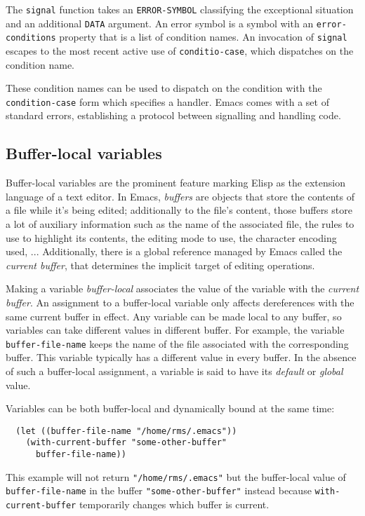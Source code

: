 \documentclass[format=acmsmall, review=false, screen=true]{acmart}
\newcommand \Elisp {Elisp}
\begin{document}
The \texttt{signal} function takes an \texttt{ERROR-SYMBOL}
classifying the exceptional situation and an additional \texttt{DATA}
argument.  An error symbol is a symbol with an
\texttt{error-conditions} property that is a list of condition names.
An invocation of \texttt{signal} escapes to the most recent active use
of \texttt{conditio-case}, which dispatches on the condition name.

These condition names can be used to dispatch on the condition with
the \texttt{condition-case} form which specifies a handler.  Emacs
comes with a set of standard errors, establishing a protocol between
signalling and handling code.

\subsection{Buffer-local variables}
\label{sec:buffer-local-variables}

Buffer-local variables are the prominent feature marking \Elisp{} as the
extension language of a text editor.  In Emacs, \emph{buffers} are objects
that store the contents of a file while it's being edited; additionally to
the file's content, those buffers store a lot of auxiliary information such
as the name of the associated file, the rules to use to highlight its
contents, the editing mode to use, the character encoding used, ...
Additionally, there is a global reference managed by Emacs called the
\emph{current buffer}, that determines the implicit target of
editing operations.

Making a variable \emph{buffer-local} associates the value of the variable
with the \emph{current buffer}.  An assignment to a buffer-local variable
only affects dereferences with the same current buffer in effect.
Any variable can be made local to any buffer, so variables can take
different values in different buffer.  For example, the variable
\texttt{buffer-file-name} keeps the name of the file associated with the
corresponding buffer.  This variable typically has a different value in
every buffer.  In the absence of such a buffer-local assignment, a variable
is said to have its \emph{default} or \emph{global} value.

Variables can be both buffer-local and dynamically bound at the same time:
\begin{verbatim}
  (let ((buffer-file-name "/home/rms/.emacs"))
    (with-current-buffer "some-other-buffer"
      buffer-file-name))
\end{verbatim}
This example will not return \texttt{"/home/rms/.emacs"} but the
buffer-local value of \texttt{buffer-file-name} in the buffer
\texttt{"some-other-buffer"} instead because \texttt{with-current-buffer}
temporarily changes which buffer is current.
\end{document}
